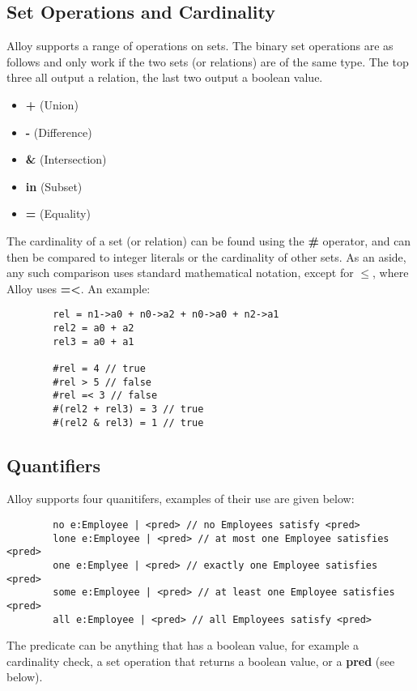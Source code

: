 \documentclass[10pt]{article}
\begin{document}
    \subsection*{Set Operations and Cardinality}
      Alloy supports a range of operations on sets. The binary set operations are as follows and only work if the two sets (or relations) are of the same type. The top three all output a relation, the last two output a boolean value.
      \begin{itemize}
        \item\textbf{+} (Union)
        \item\textbf{-} (Difference)
        \item\textbf{\&} (Intersection)
        \item\textbf{in} (Subset)
        \item\textbf{=} (Equality)
      \end{itemize}\par
      The cardinality of a set (or relation) can be found using the \textbf{\#} operator, and can then be compared to integer literals or the cardinality of other sets. As an aside, any such comparison uses standard mathematical notation, except for $\leq$, where Alloy uses \textbf{=\textless}. An example:
      \begin{lstlisting}
        rel = n1->a0 + n0->a2 + n0->a0 + n2->a1
        rel2 = a0 + a2
        rel3 = a0 + a1

        #rel = 4 // true
        #rel > 5 // false
        #rel =< 3 // false
        #(rel2 + rel3) = 3 // true
        #(rel2 & rel3) = 1 // true
      \end{lstlisting}\par
    \subsection*{Quantifiers}
      Alloy supports four quanitifers, examples of their use are given below:
      \begin{lstlisting}
        no e:Employee | <pred> // no Employees satisfy <pred>
        lone e:Employee | <pred> // at most one Employee satisfies <pred>
        one e:Emplyee | <pred> // exactly one Employee satisfies <pred>
        some e:Employee | <pred> // at least one Employee satisfies <pred>
        all e:Employee | <pred> // all Employees satisfy <pred>
      \end{lstlisting}
      The predicate can be anything that has a boolean value, for example a cardinality check, a set operation that returns a boolean value, or a \textbf{pred} (see below).
\end{document}
